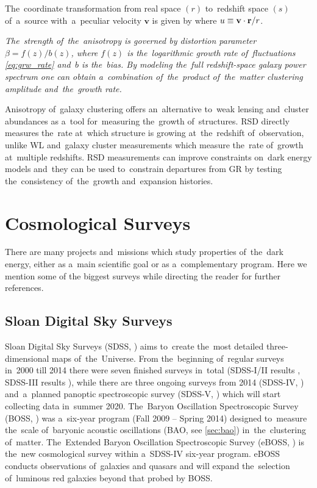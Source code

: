 The~coordinate transformation from real space $(r)$ to~redshift space $(s)$ of~a~source with~a~peculiar velocity $\bm v$ is given by \parencite{2010deto.book.....A}
where $u\equiv\mathbf v\cdot\mathbf r/r$. {\itshape The~strength of~the~anisotropy is governed by distortion parameter $\beta = f(z)/b(z)$, where $f(z)$ is the~logarithmic growth rate of~fluctuations \eqref{eq:grw_rate} and~$b$ is the~bias. By modeling the~full redshift-space galaxy power spectrum one can obtain a~combination of~the~product of~the~matter clustering amplitude and~the~growth rate.

Anisotropy of~galaxy clustering offers an~alternative to~weak lensing and~cluster abundances as a~tool for~measuring the~growth of~structures. RSD directly measures the~rate at~which structure is growing at~the~redshift of~observation, unlike WL and~galaxy cluster measurements which measure the~rate of~growth at~multiple redshifts. RSD measurements can improve constraints on~dark energy models and~they can be used to~constrain departures from GR by testing the~consistency of~the~growth and~expansion histories.
} 
\section{Cosmological Surveys}
There are many projects and~missions which study properties of~the~dark energy, either as a~main scientific goal or as a~complementary program. Here we mention some of the biggest surveys while directing the reader for further references.
\subsection{Sloan Digital Sky Surveys}
Sloan Digital Sky Surveys (SDSS, \cite{SDSS}) aims to~create the~most detailed three-dimensional maps of~the~Universe. From the~beginning of~regular surveys in~2000 till 2014 there were seven finished surveys in~total (SDSS-I/II results \cite{SDSS_I_II}, SDSS-III results \cite{BOSS_results}), while there are three ongoing surveys from 2014 (SDSS-IV, \cite{2017AJ....154...28B}) and~a~planned panoptic spectroscopic survey (SDSS-V, \cite{2017arXiv171103234K}) which will start collecting data in~summer 2020. The~Baryon Oscillation Spectroscopic Survey (BOSS, \cite{BOSS}) was a~six-year program (Fall 2009 -- Spring 2014) designed to~measure the~scale of~baryonic acoustic oscillations (BAO, see \autoref{sec:bao}) in~the~clustering of~matter. The~Extended Baryon Oscillation Spectroscopic Survey (eBOSS, \cite{2016AJ....151...44D}) is the~new cosmological survey within a~SDSS-IV six-year program. eBOSS conducts observations of~galaxies and quasars and will expand the~selection of~luminous red galaxies beyond that probed by BOSS.
